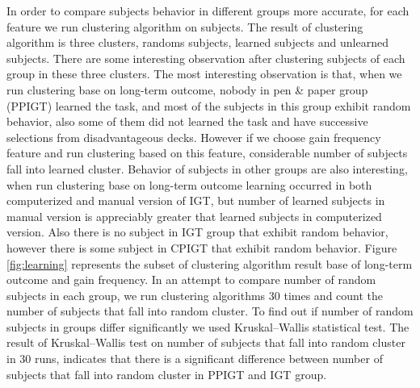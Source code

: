 In order to compare subjects behavior in different groups
more accurate, for each feature we run clustering algorithm
on subjects. The result of clustering algorithm is three
clusters, randoms subjects, learned subjects and unlearned
subjects. There are some interesting observation after
clustering subjects of each group in these three clusters.
The most interesting observation is that, when we run
clustering base on long-term outcome, nobody in pen \& paper group
(PPIGT) learned the task, and most of the subjects in this group
exhibit random behavior, also some of them did not
learned the task and have successive selections from
disadvantageous decks. However if we choose gain frequency
feature and run clustering based on this feature,
considerable number of subjects fall into learned cluster.
Behavior of subjects in other groups are also interesting,
when run clustering base on long-term outcome learning
occurred in both computerized and manual version of IGT, but number of
learned subjects in manual version is appreciably greater that learned
subjects in computerized version. Also there is no subject in IGT group
that exhibit random behavior, however there is some subject in CPIGT
that exhibit random behavior. Figure \ref{fig:learning} represents the
subset of clustering algorithm result base of long-term outcome and gain
frequency.  In an attempt to compare number of random subjects in each
group, we run clustering algorithms 30 times and count the number of
subjects that fall into random cluster. To find out if number of random
subjects in groups differ significantly we used Kruskal–Wallis statistical test.
The result of Kruskal–Wallis test on number of subjects that fall into random
cluster in 30 runs, indicates that there is a significant difference
between number of subjects that fall into random cluster in PPIGT and
IGT group.

